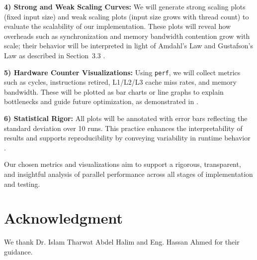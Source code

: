 \documentclass[conference, 10pt]{IEEEtran}
\begin{document}
\textbf{4) Strong and Weak Scaling Curves:} 
We will generate strong scaling plots (fixed input size) and weak scaling plots (input size grows with thread count) to evaluate the scalability of our implementation. These plots will reveal how overheads such as synchronization and memory bandwidth contention grow with scale; their behavior will be interpreted in light of Amdahl’s Law and Gustafson’s Law as described in Section~3.3 \cite{hager2021hpc, Gustafson1988}.

\vspace{0.5em}
\textbf{5) Hardware Counter Visualizations:} 
Using \texttt{perf}, we will collect metrics such as cycles, instructions retired, L1/L2/L3 cache miss rates, and memory bandwidth. These will be plotted as bar charts or line graphs to explain bottlenecks and guide future optimization, as demonstrated in \cite{Yoon2012}.

\vspace{0.5em}
\textbf{6) Statistical Rigor:} 
All plots will be annotated with error bars reflecting the standard deviation over 10 runs. This practice enhances the interpretability of results and supports reproducibility by conveying variability in runtime behavior \cite{Yoon2012}.

Our chosen metrics and visualizations aim to support a rigorous, transparent, and insightful analysis of parallel performance across all stages of implementation and testing.







\section*{Acknowledgment} 
We thank Dr. Islam Tharwat Abdel Halim and Eng. Hassan Ahmed for their guidance.


 
\end{document}

